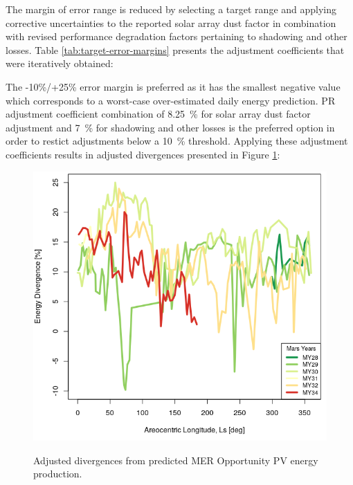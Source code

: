
The margin of error range is reduced by selecting a target range and applying corrective uncertainties to the reported solar array dust factor in combination with revised performance degradation factors pertaining to shadowing and other losses. Table \ref{tab:target-error-margins} presents the adjustment coefficients that were iteratively obtained:




The -10\%/+25\% error margin is preferred as it has the smallest negative value which corresponds to a worst-case over-estimated daily energy prediction. PR adjustment coefficient combination of \SI{8.25}{\percent} for solar array dust factor adjustment and \SI{7}{\percent} for shadowing and other losses is the preferred option in order to restict adjustments below a \SI{10}{\percent} threshold. Applying these adjustment coefficients results in adjusted divergences presented in Figure \ref{fig:plot:mer-energy-prediction-divergences-adjusted}:

\begin{figure}[H]
  \centering
  \hypersetup{linkcolor=captionTextColor}
  \includegraphics[width=0.8\linewidth]{sections/power-and-energy-predictions/plots/energy-prediction-divergences-adjusted.png}\\
  \caption[Adjusted divergences from predicted MER Opportunity PV energy production]
          {Adjusted divergences from predicted MER Opportunity PV energy production.}
  \label{fig:plot:mer-energy-prediction-divergences-adjusted}
\end{figure}


